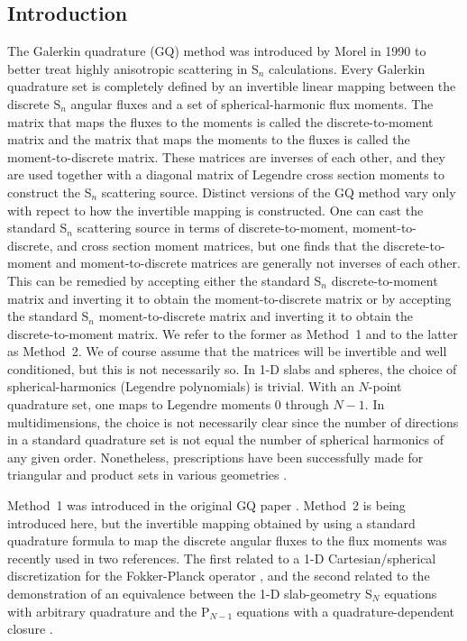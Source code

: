 \documentclass[12pt]{article}
\begin{document}
\begin{center}
\section{Introduction}
\label{sec:intro}
The Galerkin quadrature (GQ) method was introduced by Morel in 1990  \cite{Morel89} to better treat highly anisotropic scattering 
in S$_n$ calculations.  Every Galerkin quadrature set is completely defined by an invertible linear mapping between the discrete 
S$_n$ angular fluxes and a set of spherical-harmonic flux moments.  The matrix that maps the fluxes to the moments is called the 
discrete-to-moment matrix and the matrix that maps the moments to the fluxes is called the moment-to-discrete matrix.  These matrices 
are inverses of each other, and they are used together with a diagonal matrix of Legendre cross section moments to construct the S$_n$ 
scattering source.  Distinct versions of the GQ method vary only with repect to how the invertible mapping is constructed.  One can 
cast the standard S$_n$ scattering source in terms of discrete-to-moment, moment-to-discrete, and cross section moment matrices, but 
one finds that the discrete-to-moment and moment-to-discrete matrices are generally not inverses of each other.  This can be remedied 
by accepting either the standard S$_n$ discrete-to-moment matrix and inverting it to obtain the moment-to-discrete matrix or by accepting 
the standard S$_n$ moment-to-discrete matrix and inverting it to obtain the discrete-to-moment matrix.  We refer to the former as Method~1 
and to the latter as Method~2.  We of course assume that the matrices will be invertible and well conditioned, but this is not necessarily so. 
In 1-D slabs and spheres, the choice of spherical-harmonics (Legendre polynomials) is trivial.  With an 
$N$-point quadrature set, one maps to Legendre moments $0$ through $N-1$.  In multidimensions, the choice is not necessarily clear since the 
number of directions in a standard quadrature set is not equal the number of spherical harmonics of any given order.  Nonetheless, 
prescriptions have been successfully made for triangular and product sets in various geometries \cite{Morel89, Richard, Trahan}.

Method~1 was introduced in the original GQ paper \cite{Morel89}. Method~2 is being introduced here, but the 
invertible mapping obtained by using a standard quadrature formula to map the discrete angular fluxes to the flux moments was recently used in 
two references. The first related to a 1-D Cartesian/spherical discretization for the Fokker-Planck operator \cite{warsa}, and the second related 
to the demonstration of an equivalence between the 1-D slab-geometry S$_N$ equations with arbitrary quadrature and the P$_{N-1}$ equations with 
a quadrature-dependent closure \cite{Morel12}. 


\end{center}
\end{document}
